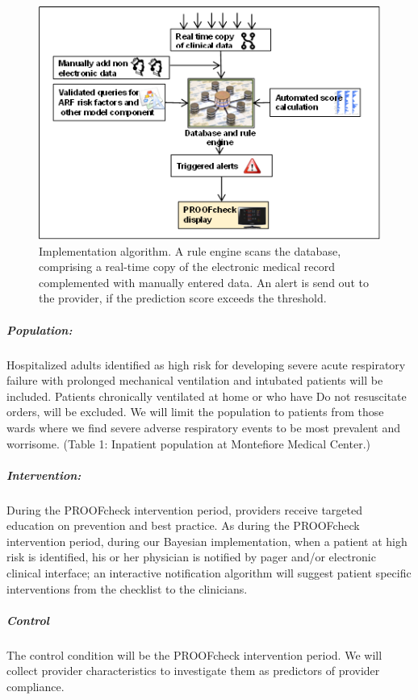 \documentclass[11pt,notitlepage]{article}
\begin{document}
\begin{figure}
\vspace{-50pt}
 \includegraphics[scale=0.7]{Figures/Alert_trigger_fig.png}
 \vspace{-30pt}
  \caption{\footnotesize Implementation algorithm. A rule engine scans the database, comprising a real-time copy of the electronic medical record complemented with manually entered data. An alert is send out to the provider, if the prediction score exceeds the threshold.}
  \label{fig:implementation}
 \vspace{-25pt}
\end{figure}

\subparagraph*{Population:} 
Hospitalized adults identified as high risk for developing severe acute respiratory failure with prolonged mechanical ventilation and intubated patients will be included. Patients chronically ventilated at home or who have Do not resuscitate orders, will be excluded. We will limit the population to patients from those wards where we find severe adverse respiratory events to be most prevalent and worrisome.
(Table 1: Inpatient population at Montefiore Medical Center.)

\subparagraph*{Intervention:}
During the PROOFcheck intervention period, providers receive targeted education on prevention and best practice. As during the PROOFcheck intervention period, during our Bayesian implementation, when a patient at high risk is identified, his or her physician is notified by pager and/or electronic clinical interface; an interactive notification algorithm will suggest patient specific interventions from the checklist to the clinicians. 

\subparagraph*{Control}
The control condition will be the PROOFcheck intervention period. We will collect provider characteristics to investigate them as predictors of provider compliance. 
\end{document}

